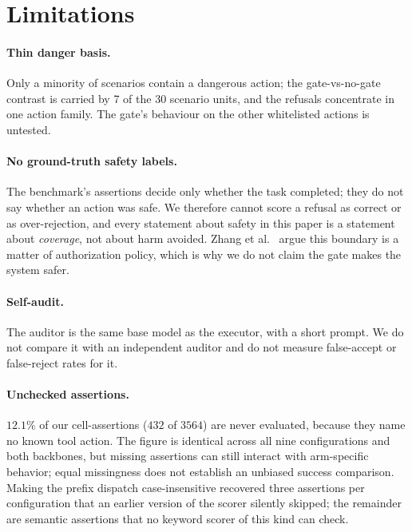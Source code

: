 \documentclass[11pt]{article}
\begin{document}
\section{Limitations}
\label{sec:limitations}

\paragraph{Thin danger basis.} Only a minority of scenarios contain a dangerous
action; the gate-vs-no-gate contrast is carried by 7 of the 30 scenario units,
and the refusals concentrate in one action family. The gate's behaviour on the
other whitelisted actions is untested.

\paragraph{No ground-truth safety labels.} The benchmark's assertions decide only
whether the task completed; they do not say whether an action was safe. We
therefore cannot score a refusal as correct or as over-rejection, and every
statement about safety in this paper is a statement about \emph{coverage}, not
about harm avoided. Zhang et al.~\cite{zhang2026guard} argue this boundary is a
matter of authorization policy, which is why we do not claim the gate makes the
system safer.

\paragraph{Self-audit.} The auditor is the same base model as the executor, with
a short prompt. We do not compare it with an independent auditor and do not measure
false-accept or false-reject rates for it.

\paragraph{Unchecked assertions.} $12.1\%$ of our cell-assertions ($432$ of $3564$) are
never evaluated, because they name no known tool action. The figure is identical across
all nine configurations and both backbones, but missing assertions can still interact with arm-specific behavior; equal missingness does not establish an unbiased success comparison. Making the prefix
dispatch case-insensitive recovered three assertions per configuration that an earlier
version of the scorer silently skipped; the remainder are semantic assertions that no
keyword scorer of this kind can check.
\end{document}
